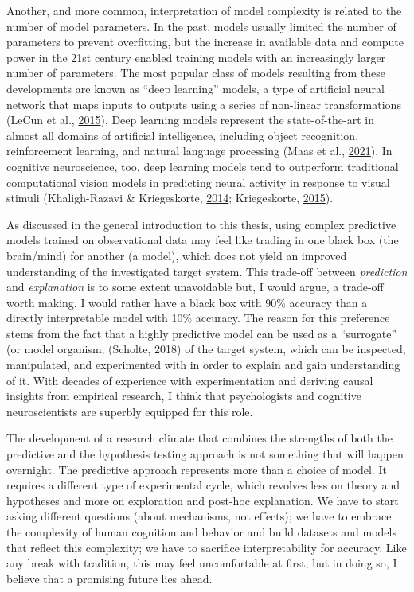 \documentclass[11pt,american,a4paper,oneside,]{memoir} %
\begin{document}
Another, and more common, interpretation of model complexity is related to the number of model parameters. In the past, models usually limited the number of parameters to prevent overfitting, but the increase in available data and compute power in the 21st century enabled training models with an increasingly larger number of parameters. The most popular class of models resulting from these developments are known as ``deep learning'' models, a type of artificial neural network that maps inputs to outputs using a series of non-linear transformations (LeCun et al., \protect\hyperlink{ref-LeCun2015-xa}{2015}). Deep learning models represent the state-of-the-art in almost all domains of artificial intelligence, including object recognition, reinforcement learning, and natural language processing (Maas et al., \protect\hyperlink{ref-Van_der_Maas2021-rx}{2021}). In cognitive neuroscience, too, deep learning models tend to outperform traditional computational vision models in predicting neural activity in response to visual stimuli (Khaligh-Razavi \& Kriegeskorte, \protect\hyperlink{ref-khaligh2014deep}{2014}; Kriegeskorte, \protect\hyperlink{ref-Kriegeskorte2015-qi}{2015}).

As discussed in the general introduction to this thesis, using complex predictive models trained on observational data may feel like trading in one black box (the brain/mind) for another (a model), which does not yield an improved understanding of the investigated target system. This trade-off between \emph{prediction} and \emph{explanation} is to some extent unavoidable but, I would argue, a trade-off worth making. I would rather have a black box with 90\% accuracy than a directly interpretable model with 10\% accuracy. The reason for this preference stems from the fact that a highly predictive model can be used as a ``surrogate'' (or model organism; (Scholte, 2018) of the target system, which can be inspected, manipulated, and experimented with in order to explain and gain understanding of it. With decades of experience with experimentation and deriving causal insights from empirical research, I think that psychologists and cognitive neuroscientists are superbly equipped for this role.

The development of a research climate that combines the strengths of both the predictive and the hypothesis testing approach is not something that will happen overnight. The predictive approach represents more than a choice of model. It requires a different type of experimental cycle, which revolves less on theory and hypotheses and more on exploration and post-hoc explanation. We have to start asking different questions (about mechanisms, not effects); we have to embrace the complexity of human cognition and behavior and build datasets and models that reflect this complexity; we have to sacrifice interpretability for accuracy. Like any break with tradition, this may feel uncomfortable at first, but in doing so, I believe that a promising future lies ahead.
\end{document}
